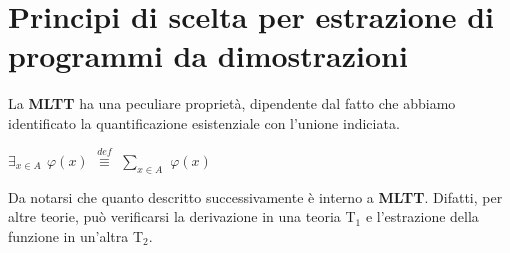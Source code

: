 \section{Principi di scelta per estrazione di programmi da dimostrazioni}
\label{sec:principi-di-scelta-per-estrazione-di-programmi-da-dimostrazioni}
La \textbf{MLTT} ha una peculiare propriet\`a, dipendente dal fatto che abbiamo identificato la quantificazione esistenziale con l'unione indiciata.
\begin{center}\textbf{$\exists_{x \in A}$ $\varphi(x)$ }${\overset{\mathit{def}}{\equiv}}$ $\sum\limits_{x \in A}$ $\varphi(x)$\end{center}
\noindent
Da notarsi che quanto descritto successivamente \`e interno a \textbf{MLTT}. Difatti, per altre teorie, pu\`o verificarsi la derivazione in una teoria T$_1$ e l'estrazione della funzione in un'altra T$_2$.

